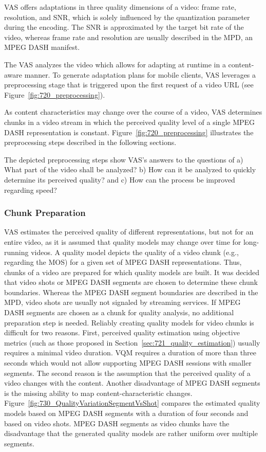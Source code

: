 \ac{VAS} offers adaptations in three quality dimensions of a video: frame rate, 
resolution, and \ac{SNR}, which is solely influenced by the  quantization parameter during the encoding. 
The \ac{SNR} is approximated by the target bit rate of the video, whereas frame rate and resolution are usually described in the \ac{MPD}, an \ac{MPEG} \ac{DASH} manifest. 

The \ac{VAS} analyzes the video which allows for adapting at runtime in a content-aware manner. 
To generate adaptation plans for mobile clients, \ac{VAS} leverages a preprocessing stage that is triggered upon the first request of a video \ac{URL} (see Figure~\ref{fig:720_preprocessing}). 

As content characteristics may change over the course of a video, \ac{VAS} determines chunks in a video stream in which the perceived quality level of a single \ac{MPEG} \ac{DASH} representation is constant.
Figure~\ref{fig:720_preprocessing} illustrates the preprocessing steps described in the following sections.

The depicted preprocessing steps show \ac{VAS}'s answers to the questions of a) What part of the video shall be analyzed? b) How can it be analyzed to quickly determine its perceived quality? and c) How can the process be improved regarding speed? 
\subsubsection{Chunk Preparation}
\label{sec:721_shot_detection}
\ac{VAS} estimates the perceived quality of different representations, but not for an entire video, as it is assumed that quality models may change over time for long-running videos.
A quality model depicts the quality of a video chunk (e.g., regarding the \ac{MOS}) for a given set of \ac{MPEG} \ac{DASH} representations.
Thus, chunks of a video are prepared for which quality models are built.
It was decided that video shots or \ac{MPEG} \ac{DASH} segments are chosen to determine these chunk boundaries.
Whereas the \ac{MPEG} \ac{DASH} segment boundaries are described in the \ac{MPD}, video shots are usually not signaled by streaming services.
If \ac{MPEG} \ac{DASH} segments are chosen as a chunk for quality analysis, no additional preparation step is needed.
Reliably creating quality models for video chunks is difficult for two reasons.
First, perceived quality estimation using objective metrics (such as those proposed in Section~\ref{sec:721_quality_estimation}) usually requires a minimal video duration.
\ac{VQM} requires a duration of more than three seconds which would not allow supporting \ac{MPEG} \ac{DASH} sessions with smaller segments.
The second reason is the assumption that the perceived quality of a video changes with the content.
Another disadvantage of \ac{MPEG} \ac{DASH} segments is the missing ability to map content-characteristic changes.
Figure~\ref{fig:730_QualityVariationSegmentVsShot} compares the estimated quality models based on \ac{MPEG} \ac{DASH} segments with a duration of four seconds and based on video shots.
\ac{MPEG} \ac{DASH} segments as video chunks have the disadvantage that the generated quality models are rather uniform over multiple segments.

